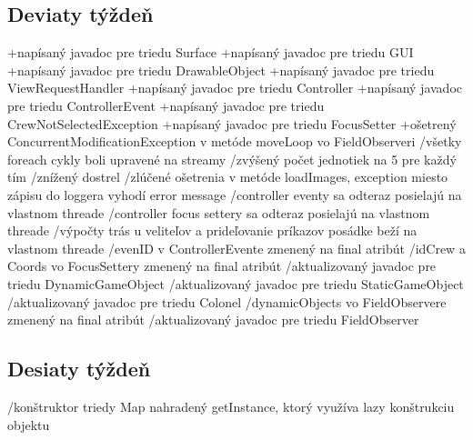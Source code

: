 \documentclass[12pt,oneside,slovak,a4paper]{article}
\begin{document}
\subsection{Deviaty týždeň}
+napísaný javadoc pre triedu Surface\newline
+napísaný javadoc pre triedu GUI\newline
+napísaný javadoc pre triedu DrawableObject\newline
+napísaný javadoc pre triedu ViewRequestHandler\newline
+napísaný javadoc pre triedu Controller\newline
+napísaný javadoc pre triedu ControllerEvent\newline
+napísaný javadoc pre triedu CrewNotSelectedException\newline
+napísaný javadoc pre triedu FocusSetter\newline
+ošetrený ConcurrentModificationException v metóde moveLoop vo FieldObserveri\newline
\newline
/všetky foreach cykly boli upravené na streamy\newline
/zvýšený počet jednotiek na 5 pre každý tím\newline
/znížený dostrel\newline
/zlúčené ošetrenia v metóde loadImages, exception miesto zápisu do loggera vyhodí error message\newline
/controller eventy sa odteraz posielajú na vlastnom threade\newline
/controller focus settery sa odteraz posielajú na vlastnom threade\newline
/výpočty trás u veliteľov a prideľovanie príkazov posádke beží na vlastnom threade\newline
/evenID v ControllerEvente zmenený na final atribút\newline
/idCrew a Coords vo FocusSettery zmenený na final atribút\newline
/aktualizovaný javadoc pre triedu DynamicGameObject\newline
/aktualizovaný javadoc pre triedu StaticGameObject\newline
/aktualizovaný javadoc pre triedu Colonel\newline
/dynamicObjects vo FieldObservere zmenený na final atribút\newline
/aktualizovaný javadoc pre triedu FieldObserver\newline
\subsection{Desiaty týždeň}
/konštruktor triedy Map nahradený getInstance, ktorý využíva lazy konštrukciu objektu
\end{document}
